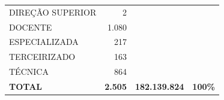 \documentclass{article}
\begin{document}
\begin{longtable}[c]{m{7cm}|m{2.5cm}|m{2.5cm}|m{2.5cm}}
\multicolumn{1}{L{7cm}|}{ \hspace{3em} DIREÇÃO SUPERIOR} & \multicolumn{1}{r|}{     2} &  & \\
\multicolumn{1}{L{7cm}|}{ \hspace{3em} DOCENTE} & \multicolumn{1}{r|}{ 1.080} &  & \\
\multicolumn{1}{L{7cm}|}{ \hspace{3em} ESPECIALIZADA} & \multicolumn{1}{r|}{   217} &  & \\
\multicolumn{1}{L{7cm}|}{ \hspace{3em} TERCEIRIZADO} & \multicolumn{1}{r|}{   163} &  & \\
\multicolumn{1}{L{7cm}|}{ \hspace{3em} TÉCNICA} & \multicolumn{1}{r|}{   864} &  & \\
\hline \hline 
\multicolumn{1}{L{7cm}|}{ \textbf{TOTAL}} & \multicolumn{1}{r|}{ \textbf{2.505}} & \multicolumn{1}{r|}{ \textbf{182.139.824}} & \multicolumn{1}{r}{ \textbf{100\%}} \\
\end{longtable}
\newpage
\small
\end{document}
